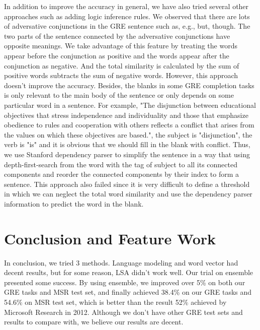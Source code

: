 \documentclass[11pt]{article}
\begin{document}
In addition to improve the accuracy in general, we have also tried several other approaches such as adding logic inference rules. We observed that there are lots of adversative conjunctions in the GRE sentence such as, e.g., but, though. The two parts of the sentence connected by the adversative conjunctions have opposite meanings. We take advantage of this feature by treating the words appear before the conjunction as positive and the words appear after the conjunction as negative. And the total similarity is calculated by the sum of positive words subtracts the sum of negative words. However, this approach doesn't improve the accuracy. Besides, the blanks in some GRE completion tasks is only relevant to the main body of the sentence or only depends on some particular word in a sentence. For example, "The disjunction between educational objectives that stress independence and individuality and those that emphasize obedience to rules and cooperation with others reflects a conflict that arises from the values on which these objectives are based.", the subject is "disjunction", the verb is "is" and it is obvious that we should fill in the blank with conflict. Thus, we use Stanford dependency parser to simplify the sentence in a way that using depth-first-search from the word with the tag of subject to all its connected components and reorder the connected components by their index to form a sentence. This approach also failed since it is very difficult to define a threshold in which we can neglect the total word similarity and use the dependency parser information to predict the word in the blank. 

\section{Conclusion and Feature Work}
In conclusion, we tried 3 methods. Language modeling and word vector had decent results, but for some reason, LSA didn't work well. Our trial on ensemble presented some success. By using ensemble, we improved over 5\% on both our GRE tasks  and MSR test set, and finally achieved 38.4\% on our GRE tasks and 54.6\% on MSR test set, which is better than the result 52\% achieved by Microsoft Research in 2012. Although we don't have other GRE test sets and results to compare with, we believe our results are decent.
\end{document}
